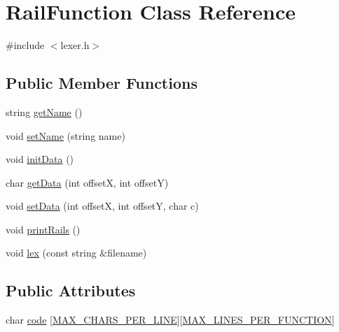 \hypertarget{classRailFunction}{\section{Rail\-Function Class Reference}
\label{classRailFunction}
}


{\ttfamily \#include $<$lexer.\-h$>$}

\subsection*{Public Member Functions}
\begin{DoxyCompactItemize}
\item 
string \hyperlink{classRailFunction_a001ae48860debf0509bbf761f089092f}{get\-Name} ()
\item 
void \hyperlink{classRailFunction_aeca8e805b9c06d51db9300f6c69009b8}{set\-Name} (string name)
\item 
void \hyperlink{classRailFunction_a485bc940067a84e6e3e9edcae021ab34}{init\-Data} ()
\item 
char \hyperlink{classRailFunction_aa732e25133a0fe107af1ec760e131279}{get\-Data} (int offset\-X, int offset\-Y)
\item 
void \hyperlink{classRailFunction_aa1ba9b04faf9ac135409271c0d39b085}{set\-Data} (int offset\-X, int offset\-Y, char c)
\item 
void \hyperlink{classRailFunction_a7779d0455d34397801d8d5b6891cf6fb}{print\-Rails} ()
\item 
void \hyperlink{classRailFunction_aa81a3bbfb960bbf7bebb5f342519805e}{lex} (const string \&filename)
\end{DoxyCompactItemize}
\subsection*{Public Attributes}
\begin{DoxyCompactItemize}
\item 
char \hyperlink{classRailFunction_a7d88f1aa53e86f9e76d60476265bed39}{code} \mbox{[}\hyperlink{lexer_8h_a3b95e0254661c995b723a9b150a821c1}{M\-A\-X\-\_\-\-C\-H\-A\-R\-S\-\_\-\-P\-E\-R\-\_\-\-L\-I\-N\-E}\mbox{]}\mbox{[}\hyperlink{lexer_8h_afe8deb2b6b8318fa96d532e836f97a20}{M\-A\-X\-\_\-\-L\-I\-N\-E\-S\-\_\-\-P\-E\-R\-\_\-\-F\-U\-N\-C\-T\-I\-O\-N}\mbox{]}
\end{DoxyCompactItemize}


